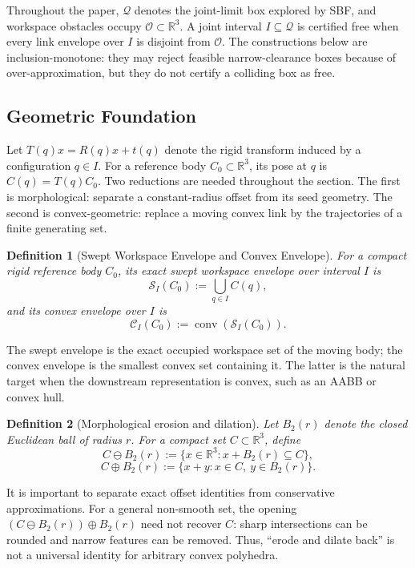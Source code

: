 \documentclass[journal]{IEEEtran}
\DeclareRobustCommand{\textsc}[1]{\textnormal{\MakeUppercase{#1}}}
\newtheorem{definition}{Definition}
\newcommand{\sbf}{\textsc{SBF}}
\newcommand{\Real}{\ensuremath{\mathbb{R}}}
\newcommand{\Q}{\ensuremath{\mathcal{Q}}}
\begin{document}
Throughout the paper, $\Q$ denotes the joint-limit box explored by \sbf{}, and
workspace obstacles occupy $\mathcal{O}\subset\Real^3$. A joint interval
$I\subseteq\Q$ is certified free when every link envelope over $I$ is disjoint
from $\mathcal{O}$. The constructions below are inclusion-monotone: they may
reject feasible narrow-clearance boxes because of over-approximation, but they
do not certify a colliding box as free.

\subsection{Geometric Foundation}\label{sec:rewrite_geom}

Let $T(q)x = R(q)x + t(q)$ denote the rigid transform induced by a
configuration $q \in I$. For a reference body $C_0 \subset \Real^3$, its pose at
$q$ is $C(q)=T(q)C_0$. Two reductions are needed throughout the section. The
first is morphological: separate a constant-radius offset from its seed
geometry. The second is convex-geometric: replace a moving convex link by the
trajectories of a finite generating set.

\begin{definition}[Swept Workspace Envelope and Convex Envelope]
For a compact rigid reference body $C_0$, its exact swept workspace envelope
over interval $I$ is
\[
\mathcal{S}_I(C_0) := \bigcup_{q\in I} C(q),
\]
and its convex envelope over $I$ is
\[
\mathcal{C}_I(C_0) := \operatorname{conv}(\mathcal{S}_I(C_0)).
\]
\end{definition}

The swept envelope is the exact occupied workspace set of the moving body; the
convex envelope is the smallest convex set containing it. The latter is the
natural target when the downstream representation is convex, such as an AABB or
convex hull.

\begin{definition}[Morphological erosion and dilation]
Let $B_2(r)$ denote the closed Euclidean ball of radius $r$. For a compact set
$C \subset \Real^3$, define
\[
C \ominus B_2(r) := \{x \in \Real^3 : x + B_2(r) \subseteq C\},
\]
\[
C \oplus B_2(r) := \{x+y : x\in C,\ y\in B_2(r)\}.
\]
\end{definition}

It is important to separate exact offset identities from conservative
approximations. For a general non-smooth set, the opening
$(C \ominus B_2(r)) \oplus B_2(r)$ need not recover $C$: sharp intersections
can be rounded and narrow features can be removed. Thus, ``erode and dilate
back'' is not a universal identity for arbitrary convex polyhedra.
\end{document}
